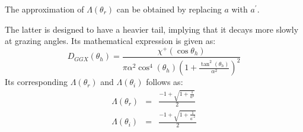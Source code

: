 \begin{itemize}
          The approximation of $\varLambda(\theta_r)$ can be obtained by replacing $a$ with $a^\prime$.


          The latter is designed to have a heavier tail, implying that it decays more slowly at grazing angles.
          Its mathematical expression is given as:
          \begin{equation}
              \label{eq_GGX}
              D_{GGX}(\theta_h) = \frac{\chi^{+}(\cos\theta_h)}{\pi \alpha^2 \cos^4(\theta_h)\left(1 + \frac{\tan^2(\theta_h)}{\alpha^2}\right)^2}
          \end{equation}
          Its corresponding $\varLambda(\theta_r)$ and $\varLambda(\theta_i)$ follows as:
          \begin{equation}
              \label{eq_varLambda_GGX}
              \begin{array}{lll}
                  \varLambda(\theta_r) & = & \frac{-1 + \sqrt{1 + \frac{1}{a^2}}}{2}          \\
                  \varLambda(\theta_i) & = & \frac{-1 + \sqrt{1 + \frac{1}{{a^\prime}^2}}}{2}
              \end{array}
          \end{equation}


\end{itemize}

